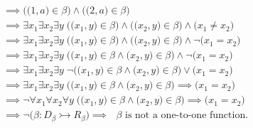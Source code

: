 \documentclass[12pt, letterpaper]{article}
\begin{document}
        \begin{align*}
            & \implies \Big(\big(1, a\big) \in \beta\Big) \wedge \Big(\big(2,a\big) \in \beta\Big) \\ 
            & \implies \exists x_1 \exists x_2 \exists y \; \Big( \big(x_1, y\big) \in \beta \Big) \wedge
                                                   \Big( \big(x_2, y\big) \in \beta \Big) \wedge
                                                   \Big( x_1 \neq x_2 \Big) \\
            & \implies \exists x_1 \exists x_2 \exists y \; \Big( \big(x_1, y\big) \in \beta \Big) \wedge
                                                   \Big( \big(x_2, y\big) \in \beta \Big) \wedge
                                                   \neg\Big( x_1 = x_2 \Big) \\
            & \implies \exists x_1 \exists x_2 \exists y \; \Big( \big(x_1, y\big) \in \beta \wedge
                                                   \big(x_2, y\big) \in \beta \Big) \wedge
                                                   \neg\Big( x_1 = x_2 \Big) \\
            & \implies \exists x_1 \exists x_2 \exists y \; \neg\Big( \big(x_1, y\big) \in \beta \wedge
                                                   \big(x_2, y\big) \in \beta \Big) \lor
                                                   \Big( x_1 = x_2 \Big) \\
            & \implies \exists x_1 \exists x_2 \exists y \; \Big( \big(x_1, y\big) \in \beta \wedge
                                                   \big(x_2, y\big) \in \beta \Big) \implies
                                                   \Big( x_1 = x_2 \Big) \\
            & \implies \neg\forall x_1 \forall x_2 \forall y \; \Big( \big(x_1, y\big) \in \beta \wedge
                                                   \big(x_2, y\big) \in \beta \Big) \implies
                                                   \Big( x_1 = x_2 \Big) \\
            & \implies \neg\Big( \beta : D_{\beta} \rightarrowtail R_{\beta} \Big)
              \implies \text{ \(\beta\) is not a one-to-one function.}
        \end{align*}
\end{document}
